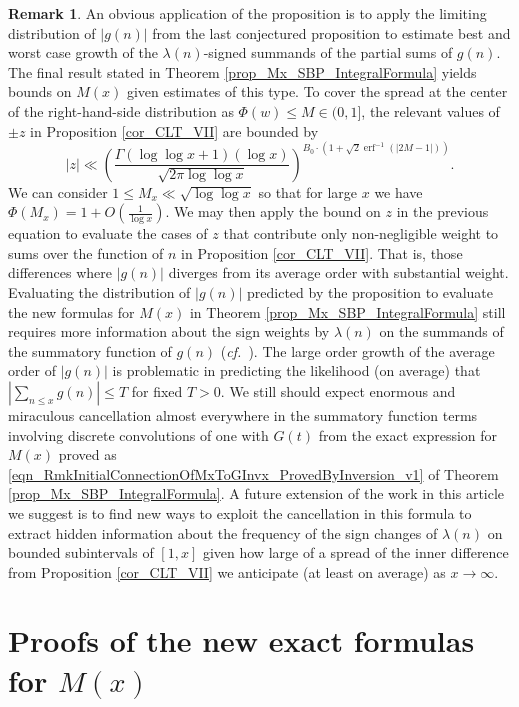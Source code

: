 \documentclass[11pt,reqno,a4letter]{article}
\newcommand{\hlocalref}[1]{\hyperref[#1]{\ref{#1}}}
\numberwithin{equation}{section}
\numberwithin{figure}{section}
\numberwithin{table}{section}
\newcommand{\cf}{\textit{cf.\ }}
\theoremstyle{plain}
\numberwithin{theorem}{section}
\theoremstyle{definition}
\newtheorem{remark}[theorem]{Remark}
\begin{document}
\begin{remark}
An obvious application of the proposition is to apply the limiting 
distribution of $|g(n)|$ from the last conjectured proposition to estimate 
best and worst case growth of the $\lambda(n)$-signed summands of the 
partial sums of $g(n)$. The final result stated in 
Theorem \hlocalref{prop_Mx_SBP_IntegralFormula} 
yields bounds on $M(x)$ given estimates of this type. 
To cover the spread at the center of the right-hand-side distribution 
as $\Phi(w) \leq M \in (0, 1]$, the relevant values of $\pm z$ in 
Proposition \hlocalref{cor_CLT_VII} are bounded by  
\[
|z| \ll \left(\frac{\Gamma(\log\log x + 1) (\log x)}{\sqrt{2\pi \log\log x}}\right)^{ 
	B_0 \cdot \left(1 + \sqrt{2} \operatorname{erf}^{-1}\left(|2M-1|\right)\right)}.
\]
We can consider $1 \leq M_x \ll \sqrt{\log\log x}$ so that for large $x$ we have
$\Phi(M_x) = 1 + O\left(\frac{1}{\log x}\right)$. 
We may then apply the bound on $z$ in the previous equation to evaluate 
the cases of $z$ that contribute only non-negligible weight to sums over 
the function of $n$ in Proposition \hlocalref{cor_CLT_VII}. 
That is, those differences where $|g(n)|$ diverges from its average 
order with substantial weight. 
Evaluating the distribution of $|g(n)|$ predicted by the proposition to 
evaluate the new formulas for $M(x)$ in 
Theorem \hlocalref{prop_Mx_SBP_IntegralFormula} 
still requires more information 
about the sign weights by $\lambda(n)$ on the summands of the summatory function of $g(n)$ 
(\cf \cite{SIGN-CHANGES-OSCARITHFUNCTS}). 
The large order growth of the average order of $|g(n)|$ is problematic in 
predicting the likelihood (on average) that 
$\left\lvert \sum_{n \leq x} g(n) \right\rvert \leq T$ for fixed $T > 0$. 
We still should expect enormous and miraculous cancellation almost everywhere 
in the summatory function terms involving discrete convolutions of one with 
$G(t)$ from the exact expression for $M(x)$ proved as 
\eqref{eqn_RmkInitialConnectionOfMxToGInvx_ProvedByInversion_v1} of 
Theorem \hlocalref{prop_Mx_SBP_IntegralFormula}. 
A future extension of the work in this article we suggest is to find new ways to 
exploit the cancellation in this formula to extract 
hidden information about the frequency of the sign changes of $\lambda(n)$ 
on bounded subintervals of $[1, x]$ given how large of a spread of the inner difference from 
Proposition \hlocalref{cor_CLT_VII} 
we anticipate (at least on average) as $x \rightarrow \infty$. 
\end{remark}

\section{Proofs of the new exact formulas for $M(x)$} 
\label{Section_KeyApplications} 
\label{Section_KeyApplications_NewExactFormulasForMx_FullSectionLabel} 
\end{document}
